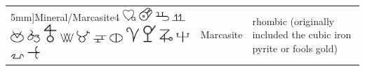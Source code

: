 \documentclass[british,final,landscape]{scrartcl}
\begin{document}
\begin{refsection}
\begin{supertabular}{p{0.3\textwidth}p{0.34\textwidth}p{0.34\textwidth}}
5mm]{Mineral/Marcasite4} \includegraphics[width=5mm]{Mineral/Marcasite5} \includegraphics[width=5mm]{Mineral/Marcasite6} \includegraphics[width=5mm]{Mineral/Marcasite7} \includegraphics[width=5mm]{Mineral/Marcasite8} \includegraphics[width=5mm]{Mineral/Marcasite9} \includegraphics[width=5mm]{Mineral/Marcasite10} \includegraphics[width=5mm]{Mineral/Marcasite11} \includegraphics[width=5mm]{Mineral/Marcasite12} \includegraphics[width=5mm]{Mineral/Marcasite13} \includegraphics[width=5mm]{Mineral/Marcasite14} \includegraphics[width=5mm]{Mineral/Marcasite15} \includegraphics[width=5mm]{Mineral/Marcasite16} \includegraphics[width=5mm]{Mineral/Marcasite17} \includegraphics[width=5mm]{Mineral/Marcasite18} \includegraphics[width=5mm]{Mineral/Marcasite19} \includegraphics[width=5mm]{Mineral/Marcasite20} \includegraphics[width=5mm]{Mineral/Marcasite21} & Marcasite & rhombic  (originally included the cubic iron pyrite or fools gold) \\

\end{supertabular}
\end{refsection}
\end{document}
